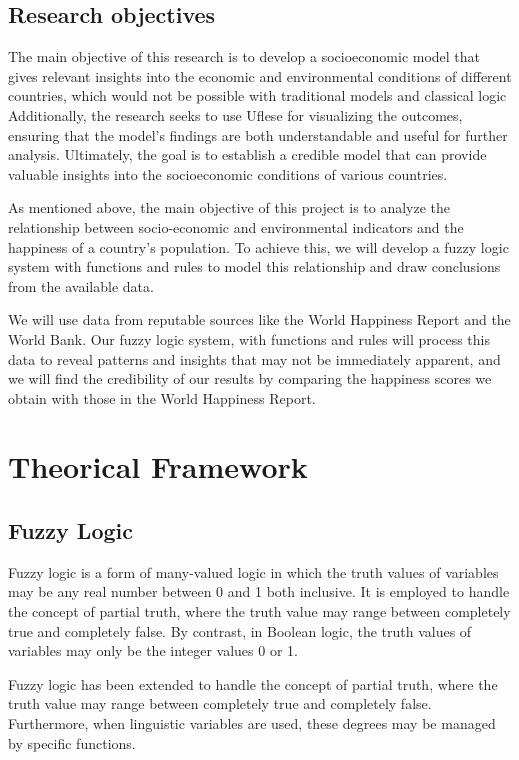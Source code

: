 \documentclass[fleqn,11pt]{article}
\begin{document}
\subsection{Research objectives}
The main objective of this research is to develop a socioeconomic model that gives relevant insights into the economic and environmental conditions of different countries, which would not be possible with traditional models and classical logic
Additionally, the research seeks to use Uflese for visualizing the outcomes, ensuring that the model's findings are both understandable and useful for further analysis. 
Ultimately, the goal is to establish a credible model that can provide valuable insights into the socioeconomic conditions of various countries.

As mentioned above, the main objective of this project is to analyze the relationship between socio-economic and environmental indicators and the happiness of a country's population. To achieve this, we will develop a fuzzy logic system with functions and rules to model this relationship and draw conclusions from the available data.

We will use data from reputable sources like the World Happiness Report and the World Bank. Our fuzzy logic system, with functions and rules will process this data to reveal patterns and insights that may not be immediately apparent, and we will find the credibility of our results by comparing the happiness scores we obtain with those in the World Happiness Report.


\section{Theorical Framework}

\subsection{Fuzzy Logic}
Fuzzy logic is a form of many-valued logic in which the truth values of variables may be any real number between 0 and 1 both inclusive. It is employed to handle the concept of partial truth, where the truth value may range between completely true and completely false. By contrast, in Boolean logic, the truth values of variables may only be the integer values 0 or 1.

Fuzzy logic has been extended to handle the concept of partial truth, where the truth value may range between completely true and completely false. Furthermore, when linguistic variables are used, these degrees may be managed by specific functions.
\end{document}
